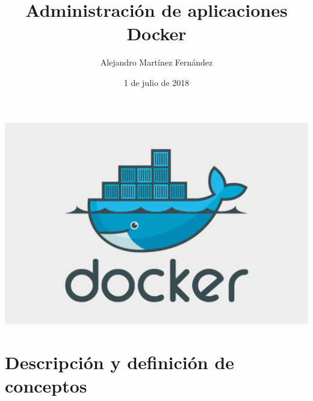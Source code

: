 \documentclass[]{article}
\title{Administración de aplicaciones Docker}
\author{Alejandro Martínez Fernández}
\date{1 de julio de 2018}
\begin{document}
\begin{titlepage}
	\maketitle
	\begin{center}
		\includegraphics[scale=0.35]{logo.png}
	\end{center}
\end{titlepage}
\tableofcontents
\section{Descripción y definición de conceptos}

\vspace{3mm}
\end{document}
